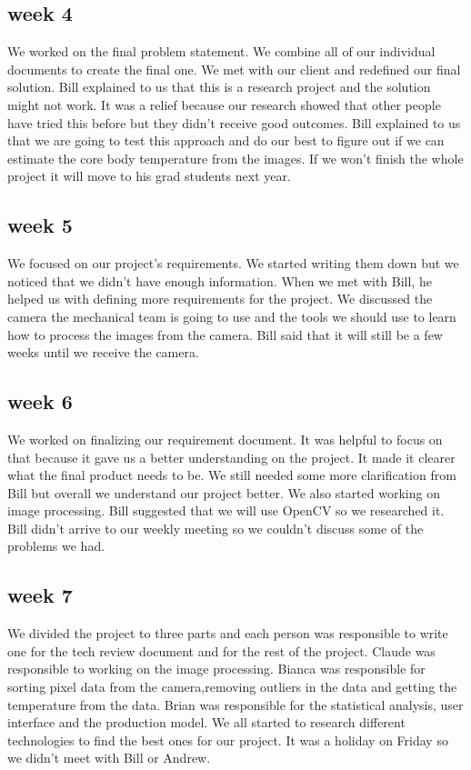 \documentclass[onecolumn, draftclsnofoot,10pt, compsoc]{IEEEtran}
\begin{document}
\subsection{week 4}
We worked on the final problem statement. We combine all of our individual documents to create the final one. We met with our client and  redefined our final solution. Bill explained to us that this is a research project and the solution might not work. It was a relief because our research showed that other people have tried this before but they didn’t receive good outcomes\cite{OtherResearch}. Bill explained to us that  we are going to test this approach and do our best to figure out if we can estimate the core body temperature from the images. If we won’t finish the whole project it will move to his grad students next year. 

\subsection{week 5}
We focused on our project's requirements. We started writing them down but we noticed that we didn’t have enough information. When we met with Bill, he helped us with defining more requirements for the project. We discussed the camera the mechanical team is going to use and the tools we should use to learn how to process the images from the camera. Bill said that it will still be a few weeks until we receive the camera. 

\subsection{week 6}
We worked on finalizing our requirement  document. It was helpful to focus on that because it gave us a better understanding on the project. It made it clearer what the final product needs to be. We still needed some more clarification from Bill  but overall we understand our project better. We also started working on image processing. Bill suggested that we will use OpenCV so we researched it. Bill didn’t arrive to our weekly meeting so we couldn’t discuss some of the problems we had. 
\subsection{week 7}
We divided the project to three parts and each person was responsible to write one for the tech review document and for the rest of the project. Claude was responsible to working on the image processing. Bianca was responsible for sorting pixel data from the camera,removing outliers in the data and getting the temperature from the data. Brian was responsible for the statistical analysis, user interface and the production model. We all started to research different technologies to find the best ones for our project. It was a holiday on Friday so we didn't meet with Bill or Andrew.
\end{document}
